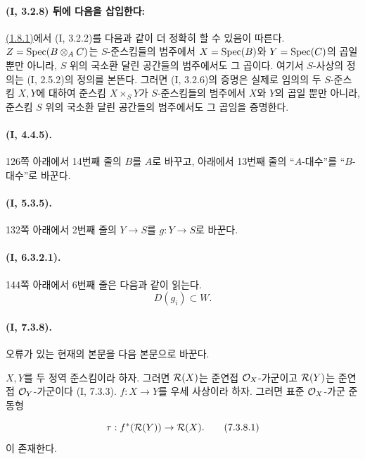 \paragraph{(I, 3.2.8) 뒤에 다음을 삽입한다:}

\begin{env}[3.2.9]
\label{ega2:addendum:I.3.2.9-ko}
\hyperref[ega2:addendum:I.1.8.1-ko]{(1.8.1)}에서 (I, 3.2.2)를 다음과 같이
더 정확히 할 수 있음이 따른다. $Z=\operatorname{Spec}(B\otimes_A C)$는
$S$-준스킴들의 범주에서 $X=\operatorname{Spec}(B)$와 $Y=\operatorname{Spec}(C)$의 곱일 뿐만 아니라,
$S$ 위의 국소환 달린 공간들의 범주에서도 그 곱이다. 여기서
$S$-사상의 정의는 (I, 2.5.2)의 정의를 본뜬다. 그러면 (I, 3.2.6)의
증명은 실제로 임의의 두 $S$-준스킴 $X,Y$에 대하여 준스킴
$X\times_S Y$가 $S$-준스킴들의 범주에서 $X$와 $Y$의 곱일 뿐만 아니라,
준스킴 $S$ 위의 국소환 달린 공간들의 범주에서도 그 곱임을 증명한다.
\end{env}

\paragraph{(I, 4.4.5).}
126쪽 아래에서 14번째 줄의 $B$를 $A$로 바꾸고, 아래에서 13번째 줄의
``$A$-대수''를 ``$B$-대수''로 바꾼다.

\paragraph{(I, 5.3.5).}
132쪽 아래에서 2번째 줄의 $Y\to S$를 $g:Y\to S$로 바꾼다.

\paragraph{(I, 6.3.2.1).}
144쪽 아래에서 6번째 줄은 다음과 같이 읽는다.
\[
  D(g_i)\subset W.
\]

\paragraph{(I, 7.3.8).}
오류가 있는 현재의 본문을 다음 본문으로 바꾼다.

$X,Y$를 두 정역 준스킴이라 하자. 그러면 $\mathcal{R}(X)$는 준연접
$\mathcal{O}_X$-가군이고 $\mathcal{R}(Y)$는 준연접 $\mathcal{O}_Y$-가군이다
(I, 7.3.3). $f:X\to Y$를 우세 사상이라 하자. 그러면 표준
$\mathcal{O}_X$-가군 준동형
\begin{equation}
\label{ega2:addendum:I.7.3.8.1-ko}
  \tau:f^*(\mathcal{R}(Y))\to\mathcal{R}(X).
\tag{7.3.8.1}
\end{equation}
이 존재한다.


